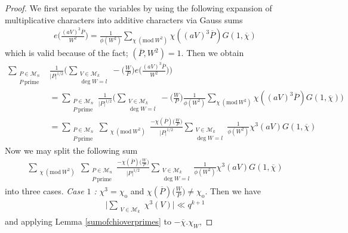 \documentclass[10pt,a4paper]{amsart}
\newcommand{\CM}{\mathcal{M}}
\newcommand{\Mod}[1]{\ (\mathrm{mod}\ #1)}
\begin{document}
\begin{proof}
We first separate the variables by using the following expansion of multiplicative characters into additive characters via Gauss sums
\begin{align*}
    e \Big ( \frac{(aV)^3\overline{P}}{W^2} \Big ) = \frac{1}{\phi(W^2)} \sum\limits_{\chi \Mod{ W^2}} \chi((aV)^3\overline{P}) G(1,\overline{\chi})
\end{align*}
which is valid because of the fact; $(\overline{P}, W^2)=1$. Then we obtain
\begin{align*}
    \sum_{\substack{P \in \CM_{n} \\ P \ \text{prime} }} & \frac{1}{|P|^{1/2}} \Big (\sum_{\substack{V \in \mathcal{M}_k \\ \deg W =l}} - \Big (\frac{W}{P} \Big ) e\Big ( \frac{(aV)^3\overline{P}}{W^2} \Big ) \Big) \\ & = \sum_{\substack{P \in \CM_{n} \\ P \ \text{prime}}} \frac{1}{|P|^{1/2}} \Big ( \sum_{\substack{V \in \mathcal{M}_k \\ \deg W =l}} - \Big (\frac{W}{P} \Big ) \frac{1}{\phi(W^2)} \sum\limits_{\chi \Mod{ W^2}} \chi((aV)^3\overline{P}) G(1,\overline{\chi}) \Big ) \\
    & = \sum_{\substack{P \in \CM_{n} \\ P \ \text{prime}}} \sum_{\substack{\chi \Mod{ W^2}}} \frac{-\chi(\overline{P}) \Big (\frac{W}{P} \Big )}{|P|^{1/2}} \sum_{\substack{V \in \mathcal{M}_k \\ \deg W =l}} \frac{1}{\phi(W^2)} \chi^3(a V) G(1,\overline{\chi})
\end{align*}
Now we may split the following sum
\begin{align*}
\sum_{\substack{\chi \Mod{ W^2}}} \sum_{\substack{ P \in \CM_{n} \\ P \ \text{prime}}} \frac{-\chi(\overline{P}) \Big (\frac{W}{P} \Big )}{|P|^{1/2}} \sum_{\substack{V \in \mathcal{M}_k \\ \deg W =l}} \frac{1}{\phi(W^2)} \chi^3(a V) G(1,\overline{\chi})
\end{align*}
into three cases.
\textit{Case $1$ :} $\chi^{3}=\chi_{\mathrm{o}}$ and $\chi(\overline{P}) \Big (\frac{W}{P} \Big ) \neq \chi_{\mathrm{o}}$. Then we have
\begin{align}\label{case1-1stbound}
    \Big | \sum_{\substack{V \in \mathcal{M}_k}} \chi^3(V) \Big | \ll q^{k + 1}
\end{align}
and applying Lemma \ref{sumofchioverprimes} to $-\overline{\chi}.\chi_{W}$,

\end{proof}
\end{document}
